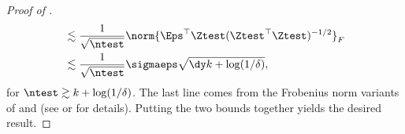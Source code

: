 \begin{proof}[Proof of ]
\begin{align*}
        &\lesssim \frac{1}{\sqrt{\ntest}} \norm{\Eps^\top \Ztest (\Ztest^\top \Ztest)^{-1/2} }_F \\
        &\lesssim \frac{1}{\sqrt{\ntest}} \sigmaeps \sqrt{\dy k + \log(1/\delta)},
    \end{align*}
    for $\ntest \gtrsim k + \log(1/\delta)$. The last line comes from the Frobenius norm variants of  and  (see \citet[Theorem 4.1]{ziemann2023tutorial} or \citet[Lemma A.3]{zhang2023meta} for details). Putting the two bounds together yields the desired result.
\end{proof}

